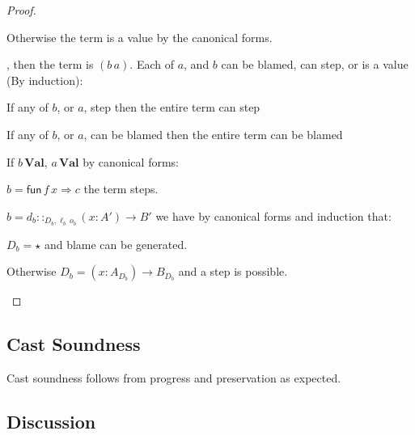 \begin{proof}
\begin{casenv}
\begin{casenv}
\begin{casenv}
     \item Otherwise the term is a value by the canonical forms.
   \end{casenv}
 \end{casenv}
 \item {}, then the term is $(b\,a)$.
  Each of $a$, and $b$ can be blamed, can step, or is a value (By induction):
  \begin{casenv}
    \item If any of $b$, or $a$, step then the entire term can step
    \item If any of $b$, or $a$, can be blamed then the entire term can be blamed
    \item If $b\,\textbf{Val}$, $a\,\textbf{Val}$ by canonical forms:
    \begin{casenv}
      \item $b=\mathsf{fun}\,f\,x\Rightarrow c$ the term steps.
      \item $b=d_{b}::_{D_{b},\ell _{b}\,o_{b}}\left(x:A'\right)\rightarrow B'$ we have by canonical forms and induction that:
      \begin{casenv}
        \item $D_{b}=\star$ and blame can be generated.
        \item Otherwise $D_{b}=\left(x:A_{D_{b}}\right)\rightarrow B_{D_{b}}$ and a step is possible.
      \end{casenv}
    \end{casenv}
  \end{casenv}
\end{casenv}
\end{proof}
 
\subsection{Cast Soundness}
 
 
Cast soundness follows from progress and preservation as expected. 
 
 
\subsection{Discussion}
 
